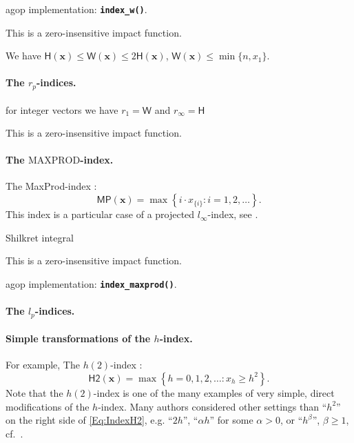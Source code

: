 \documentclass[11pt]{article}\usepackage{graphicx, color}
\newcommand{\hlfunctioncall}[1]{\textcolor[rgb]{0.501960784313725,0,0.329411764705882}{\textbf{#1}}}%
\newcommand{\package}[1]{\textsf{#1}\xspace}
\newcommand{\Rfunc}[1]{\texttt{\hlfunctioncall{#1}}}
\newcommand{\vect}[1]{{\mathbf{#1}}}
\newcommand{\func}[1]{{\mathsf{#1}}}
\theoremstyle{remark}
\theoremstyle{definition}
\begin{document}
\package{agop} implementation: \Rfunc{index\_w()}.

This is a zero-insensitive impact function.

We have $\func{H}(\vect{x})\le\func{W}(\vect{x})\le 2\func{H}(\vect{x})$,
$\func{W}(\vect{x})\le \min\{n, x_{1}\}$.







\paragraph{The $r_p$-indices.}\cite{GagolewskiGrzegorzewski2009:geometricapproach}
for integer vectors we have $r_1=\func{W}$ and $r_\infty=\func{H}$

This is a zero-insensitive impact function.





\paragraph{The $\mathrm{MAXPROD}$-index.}
The MaxProd-index \cite{Kosmulski2007:maxprod}:
\begin{equation}\label{Eq:IndexMaxProd}
   \func{MP}(\vect{x}) = \max\left\{i\cdot{{x}}_{\{i\}}: i=1,2,\ldots\right\}.
\end{equation}
This index is a particular case of a projected $l_\infty$-index,
see \cite{GagolewskiGrzegorzewski2009:geometricapproach}.

Shilkret integral \cite{Shilkret1971:maxitivemeasure}

This is a zero-insensitive impact function.

\package{agop} implementation: \Rfunc{index\_maxprod()}.




\paragraph{The $l_p$-indices.}\cite{GagolewskiGrzegorzewski2009:geometricapproach}


\paragraph{Simple transformations of the $h$-index.}
For example, The $h(2)$-index \cite{Kosmulski2006:h2}:
\begin{equation}\label{Eq:IndexH2}
\func{H2}(\vect{x}) = \max\left\{h=0,1,2,\ldots: {x}_{h} \ge h^2\right\}. %
\end{equation}
Note that the $h(2)$-index is one of the many examples of very
simple, direct modifications of the $h$-index.
Many authors considered other settings than ``$h^2$'' on the right
side of \eqref{Eq:IndexH2}, e.g. ``$2h$'', ``$\alpha h$'' for some
$\alpha > 0$, or ``$h^\beta$'', $\beta\ge 1$, cf.~\cite{AlonsoETAL2009:hreview}.
\end{document}
